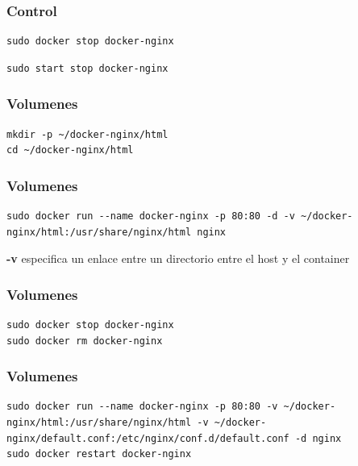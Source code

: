 \documentclass[compress]{beamer}
\begin{document}
\begin{frame}[fragile]
\frametitle{Control}
\begin{lstlisting}
sudo docker stop docker-nginx
\end{lstlisting}


\begin{lstlisting}
sudo start stop docker-nginx
\end{lstlisting}

\end{frame}



\begin{frame}[fragile]
\frametitle{Volumenes}
\begin{lstlisting}
mkdir -p ~/docker-nginx/html
cd ~/docker-nginx/html
\end{lstlisting}

\end{frame}


\begin{frame}[fragile]
\frametitle{Volumenes}
\begin{lstlisting}
sudo docker run --name docker-nginx -p 80:80 -d -v ~/docker-nginx/html:/usr/share/nginx/html nginx
\end{lstlisting}

\textbf{-v} especifica un enlace entre un directorio entre el host y el container
\end{frame}



\begin{frame}[fragile]
\frametitle{Volumenes}
\begin{lstlisting}
sudo docker stop docker-nginx
sudo docker rm docker-nginx

\end{lstlisting}

\end{frame}


\begin{frame}[fragile]
\frametitle{Volumenes}
\begin{lstlisting}
sudo docker run --name docker-nginx -p 80:80 -v ~/docker-nginx/html:/usr/share/nginx/html -v ~/docker-nginx/default.conf:/etc/nginx/conf.d/default.conf -d nginx
sudo docker restart docker-nginx
\end{lstlisting}

\end{frame}
\end{document}

